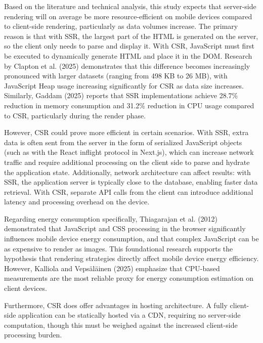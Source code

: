Based on the literature and technical analysis, this study expects that server-side rendering will on average be more resource-efficient on mobile devices compared to client-side rendering, particularly as data volumes increase. The primary reason is that with SSR, the largest part of the HTML is generated on the server, so the client only needs to parse and display it. With CSR, JavaScript must first be executed to dynamically generate HTML and place it in the DOM. Research by Clapton et al. (2025) demonstrates that this difference becomes increasingly pronounced with larger datasets (ranging from 498 KB to 26 MB), with JavaScript Heap usage increasing significantly for CSR as data size increases. Similarly, Gaddam (2025) reports that SSR implementations achieve 28.7\% reduction in memory consumption and 31.2\% reduction in CPU usage compared to CSR, particularly during the render phase.

However, CSR could prove more efficient in certain scenarios. With SSR, extra data is often sent from the server in the form of serialized JavaScript objects (such as with the React inflight protocol in Next.js), which can increase network traffic and require additional processing on the client side to parse and hydrate the application state. Additionally, network architecture can affect results: with SSR, the application server is typically close to the database, enabling faster data retrieval. With CSR, separate API calls from the client can introduce additional latency and processing overhead on the device.

Regarding energy consumption specifically, Thiagarajan et al. (2012) demonstrated that JavaScript and CSS processing in the browser significantly influences mobile device energy consumption, and that complex JavaScript can be as expensive to render as images. This foundational research supports the hypothesis that rendering strategies directly affect mobile device energy efficiency. However, Kalliola and Vepsäläinen (2025) emphasize that CPU-based measurements are the most reliable proxy for energy consumption estimation on client devices.

Furthermore, CSR does offer advantages in hosting architecture. A fully client-side application can be statically hosted via a CDN, requiring no server-side computation, though this must be weighed against the increased client-side processing burden.
